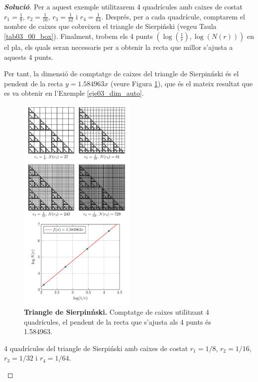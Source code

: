\documentclass[12pt,a4paper]{report}
\newcommand*{\myproofname}{\textbf{Solució}}
\newenvironment{myproof}[1][\myproofname]{\begin{proof}[#1]\renewcommand*{\qedsymbol}{\(\blacksquare\)}}{\end{proof}}
\begin{document}
\begin{myproof}
Per a aquest exemple  utilitzarem  4 quadrícules  amb caixes de costat $r_1=\displaystyle\frac{1}{8}$, $r_2=\displaystyle\frac{1}{16}$,  $r_3=\displaystyle\frac{1}{32}$ i $r_4=\displaystyle\frac{1}{64}$. Després, per a cada quadrícule,  comptarem el nombre de caixes que cobreixen el triangle de Sierpiński (vegeu Taula \ref{tab03_00_box}). Finalment, trobem els 4 punts $\left(\log\left(\displaystyle\frac{1}{r}\right),\log(N(r))\right)$ en el pla, els quals seran necessaris per a obtenir la recta que millor s'ajusta a aquests 4 punts. 

Per tant, la dimensió de comptatge de caixes del triangle de Sierpinński és el pendent de la recta $y = 1.584963x$ (veure Figura \ref{img03_dim_box}), que és  el mateix resultat que es va obtenir en l'Exemple \ref{eje03_dim_auto}.

\begin{figure}[!ht]
\centering
\includegraphics[width=0.5\textwidth]{img/img02_dim_sierpinski.pdf} 
\caption{\textbf{Triangle de Sierpinński.} Comptatge de caixes utilitzant 4 quadrícules, el pendent de la recta que s'ajusta als 4 punts és 1.584963.}
\label{img03_dim_box}
\end{figure}
\begin{table}[!ht]
\centering
{}
\caption{4 quadrícules del triangle de Sierpiński amb caixes de costat $r_1=1/8$, $r_2=1/16$,  $r_3=1/32$ i $r_4=1/64$.}
\label{tab03_00_box}
\end{table}
\end{myproof}
\end{document}

